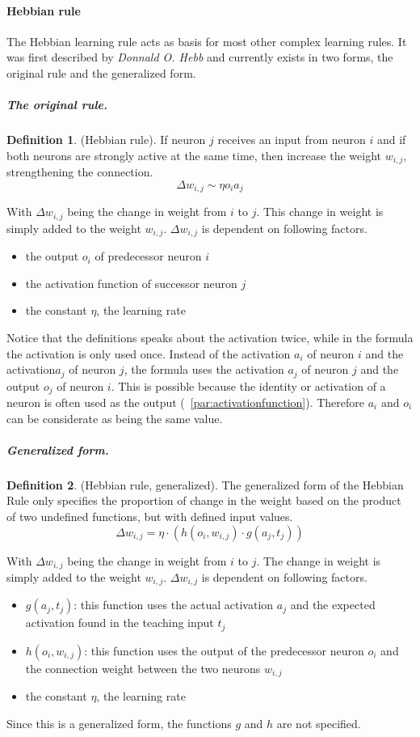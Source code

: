\documentclass[pdftex,a4paper,12pt,twoside]{report}
\theoremstyle{plain} \newtheorem{theorem}{Theorem} \newtheorem{proposition}{Proposition} \newtheorem{lemma}{Lemma} \newtheorem*{corollary}{Corollary}
\theoremstyle{definition} \newtheorem{definition}{Definition} \newtheorem{conjecture}{Conjecture} \newtheorem*{example}{Example} \newtheorem{algorithm}{Algorithm}
\theoremstyle{remark} \newtheorem*{remark}{Remark} \newtheorem*{note}{Note} \newtheorem{case}{Case}
\begin{document}
\paragraph{Hebbian rule}
The Hebbian learning rule acts as basis for most other complex learning rules. It was first described by \emph{Donnald O. Hebb} \citep{Hebb1949} and currently exists in two forms, the original rule and the generalized form.
\subparagraph{The original rule.}
\begin{definition}
(Hebbian rule). If neuron $j$ receives an input from neuron $i$ and if both neurons are strongly active at the same time, then increase the weight $w_{i,j}$, strengthening the connection.
\begin{equation}
\Delta w_{i,j} \sim \eta o_ia_j
\end{equation}
\end{definition}
With $\Delta w_{i,j}$ being the change in weight from $i$ to $j$. This change in weight is simply added to the weight $w_{i,j}$. $\Delta w_{i,j}$ is dependent on following factors.
\begin{itemize}
\item the output $o_i$ of predecessor neuron $i$
\item the activation function of successor neuron $j$
\item the constant $\eta$, the learning rate
\end{itemize}
Notice that the definitions speaks about the activation twice, while in the formula the activation is only used once. Instead of the activation $a_i$ of neuron $i$ and the activation$a_j$ of neuron $j$, the formula uses the activation $a_j$ of neuron $j$ and the output $o_j$ of neuron $i$. This is possible because the identity or activation of a neuron is often used as the output (~\ref{par:activationfunction}). Therefore $a_i$ and $o_i$ can be considerate as being the same value.
\subparagraph{Generalized form.}
\begin{definition}
(Hebbian rule, generalized). The generalized form of the Hebbian Rule only specifies the proportion of change in the weight based on the product of two undefined functions, but with defined input values.
\begin{equation}
\Delta w_{i,j} = \eta \cdot (h(o_i,w_{i,j}) \cdot g(a_j,t_j))
\end{equation}
\end{definition}
\label{equa:generalizedHebbian}
With $\Delta w_{i,j}$ being the change in weight from $i$ to $j$. The change in weight is simply added to the weight $w_{i,j}$. $\Delta w_{i,j}$ is dependent on following factors.
\begin{itemize}
\item $g(a_j,t_j)$: this function uses the actual activation $a_j$ and the expected activation found in the teaching input $t_j$
\item $h(o_i,w_{i,j})$: this function uses the output of the predecessor neuron $o_i$ and the connection weight between the two neurons $w_{i,j}$
\item the constant $\eta$, the learning rate
\end{itemize}
Since this is a generalized form, the functions $g$ and $h$ are not specified.
\end{document}

